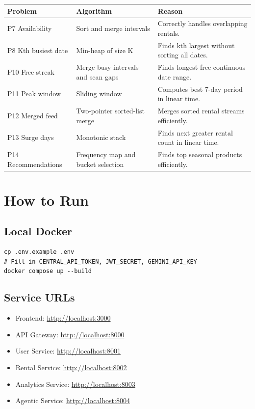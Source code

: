 \documentclass[11pt,a4paper]{article}
\begin{document}
\begin{longtable}{|p{4cm}|p{5cm}|p{5cm}|}
\hline
\textbf{Problem} & \textbf{Algorithm} & \textbf{Reason} \\
\hline
P7 Availability & Sort and merge intervals & Correctly handles overlapping rentals. \\
\hline
P8 Kth busiest date & Min-heap of size K & Finds kth largest without sorting all dates. \\
\hline
P10 Free streak & Merge busy intervals and scan gaps & Finds longest free continuous date range. \\
\hline
P11 Peak window & Sliding window & Computes best 7-day period in linear time. \\
\hline
P12 Merged feed & Two-pointer sorted-list merge & Merges sorted rental streams efficiently. \\
\hline
P13 Surge days & Monotonic stack & Finds next greater rental count in linear time. \\
\hline
P14 Recommendations & Frequency map and bucket selection & Finds top seasonal products efficiently. \\
\hline
\end{longtable}

\section{How to Run}

\subsection{Local Docker}

\begin{lstlisting}
cp .env.example .env
# Fill in CENTRAL_API_TOKEN, JWT_SECRET, GEMINI_API_KEY
docker compose up --build
\end{lstlisting}

\subsection{Service URLs}

\begin{itemize}
  \item Frontend: \url{http://localhost:3000}
  \item API Gateway: \url{http://localhost:8000}
  \item User Service: \url{http://localhost:8001}
  \item Rental Service: \url{http://localhost:8002}
  \item Analytics Service: \url{http://localhost:8003}
  \item Agentic Service: \url{http://localhost:8004}
\end{itemize}
\end{document}
